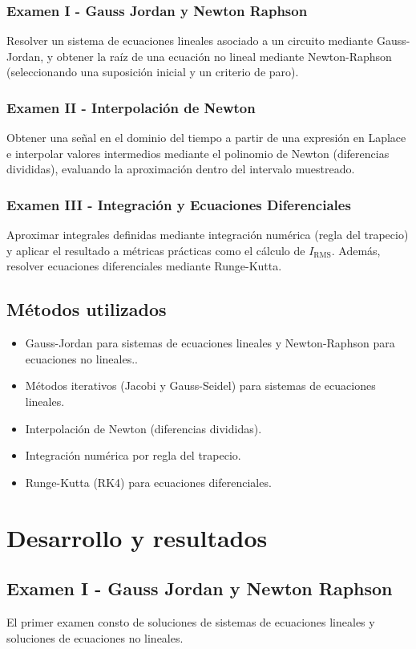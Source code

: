 \documentclass[pdflatex,sn-mathphys-num]{sn-jnl}%
\begin{document}
\subsubsection{Examen I - Gauss Jordan y Newton Raphson}
Resolver un sistema de ecuaciones lineales asociado a un circuito mediante Gauss-Jordan, y obtener la raíz de una ecuación no lineal mediante Newton-Raphson (seleccionando una suposición inicial y un criterio de paro).

\subsubsection{Examen II - Interpolación de Newton}
Obtener una señal en el dominio del tiempo a partir de una expresión en Laplace e interpolar valores intermedios mediante el polinomio de Newton (diferencias divididas), evaluando la aproximación dentro del intervalo muestreado.

\subsubsection{Examen III - Integración y Ecuaciones Diferenciales}
Aproximar integrales definidas mediante integración numérica (regla del trapecio) y aplicar el resultado a métricas prácticas como el cálculo de $I_{\mathrm{RMS}}$. Además, resolver ecuaciones diferenciales mediante Runge-Kutta.


\subsection{Métodos utilizados}
\begin{itemize}
    \item Gauss-Jordan para sistemas de ecuaciones lineales y  Newton-Raphson para ecuaciones no lineales..
    \item Métodos iterativos (Jacobi y Gauss-Seidel) para sistemas de ecuaciones lineales.
    \item Interpolación de Newton (diferencias divididas).
    \item Integración numérica por regla del trapecio.
    \item Runge-Kutta (RK4) para ecuaciones diferenciales.
\end{itemize}
\section{Desarrollo y resultados}
\subsection{Examen I - Gauss Jordan y Newton Raphson}
El primer examen consto de soluciones de sistemas de ecuaciones lineales y soluciones de ecuaciones no lineales. 
\end{document}
